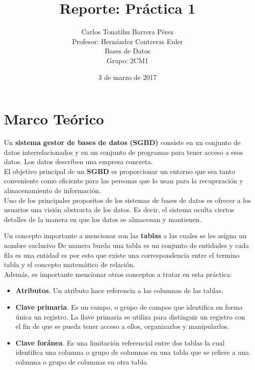 \documentclass[12pt, titlepage]{article}
\title{Reporte: Práctica 1}
\author{Carlos Tonatihu Barrera Pérez \\ Profesor: Hernández Contreras Euler \\ Bases de Datos \\ Grupo: 2CM1 }
\date{3 de marzo de 2017}
\begin{document}
    \maketitle
    \tableofcontents
    \section{Marco Teórico}
    Un \textbf{sistema gestor de bases de datos (SGBD)} consiste en un conjunto de datos interrelacionados y en un conjunto de programas para tener acceso a esos datos. Los datos describen una empresa concreta.
    \\
    El objetivo principal de un \textbf{SGBD} es proporcionar un entorno que sea tanto conveniente como eficiente para las personas que lo usan para la recuperación y almacenamiento de información.
    \\
    Uno de los principales propositos de los sistemas de bases de datos es ofrecer a los usuarios una visión abstracta de los datos. Es decir, el sistema oculta ciertos detalles de la manera en que los datos se almacenan y mantienen.\cite{LIBRO}
    
    Un concepto importante a mencionar son las \textbf{tablas} a las cuales se les asigna un nombre exclusivo De manera burda una tabla es un conjunto de entidades y cada fila es una entidad es por esto que existe una correspondencia entre el termino tabla y el concepto matemático de relación.\cite{LIBRO}
    \\
    Además, es importante mencionar otros conceptos a tratar en esta práctica:
    \begin{itemize}
        \item \textbf{Atributos}. Un atributo hace referencia a las columnas de las tablas.
        \item \textbf{Clave primaria}. Es un campo, o grupo de campos que identifica en forma única un registro. La llave primaria se utiliza para distinguir un registro con el fin de que se pueda  tener acceso a ellos, organizarlos y manipularlos. 
        \item \textbf{Clave foránea}. Es una limitación referencial entre dos tablas la cual identifica una columna o grupo de columnas en una tabla que se refiere a una columna o grupo de columnas en otra tabla.
    \end{itemize}
    \newpage
\end{document}
